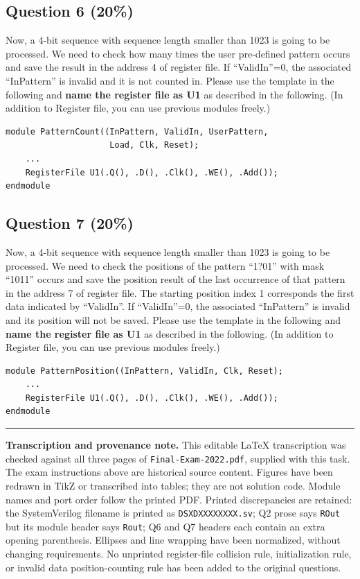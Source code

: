 \documentclass[11pt,a4paper]{article}
\newcommand{\question}[2]{\subsection*{Question #1 \hfill (#2\%)}}
\newcommand{\signal}[1]{\texttt{#1}}
\begin{document}
\question{6}{20}
Now, a 4-bit sequence with sequence length smaller than 1023 is going to
be processed. We need to check how many times the user pre-defined pattern
occurs and save the result in the address 4 of register file. If
``ValidIn''=0, the associated ``InPattern'' is invalid and it is not
counted in. Please use the template in the following and
\textbf{name the register file as U1} as described in the following.
(In addition to Register file, you can use previous modules freely.)
\begin{verbatim}
module PatternCount((InPattern, ValidIn, UserPattern,
                     Load, Clk, Reset);
    ...
    RegisterFile U1(.Q(), .D(), .Clk(), .WE(), .Add());
endmodule
\end{verbatim}

\question{7}{20}
Now, a 4-bit sequence with sequence length smaller than 1023 is going to
be processed. We need to check the positions of the pattern ``1?01'' with
mask ``1011'' occurs and save the position result of the last occurrence
of that pattern in the address 7 of register file. The starting position
index 1 corresponds the first data indicated by ``ValidIn''. If
``ValidIn''=0, the associated ``InPattern'' is invalid and its position
will not be saved. Please use the template in the following and
\textbf{name the register file as U1} as described in the following.
(In addition to Register file, you can use previous modules freely.)
\begin{verbatim}
module PatternPosition((InPattern, ValidIn, Clk, Reset);
    ...
    RegisterFile U1(.Q(), .D(), .Clk(), .WE(), .Add());
endmodule
\end{verbatim}

\bigskip\hrule\smallskip
\textbf{Transcription and provenance note.} This editable LaTeX
transcription was checked against all three pages of
\signal{Final-Exam-2022.pdf}, supplied with this task. The exam instructions
above are historical source content. Figures have been redrawn in TikZ or
transcribed into tables; they are not solution code. Module names and port
order follow the printed PDF. Printed discrepancies are retained:
the SystemVerilog filename is printed as \signal{DSXDXXXXXXXX.sv};
Q2 prose says \signal{ROut} but its module header says \signal{Rout};
Q6 and Q7 headers each contain an extra opening parenthesis. Ellipses and
line wrapping have been normalized, without changing requirements. No
unprinted register-file collision rule, initialization rule, or invalid
data position-counting rule has been added to the original questions.
\end{document}
